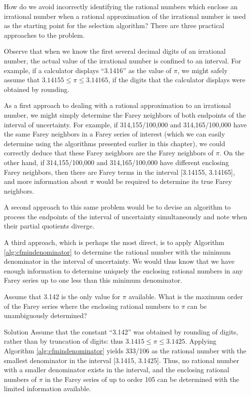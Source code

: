 How do we avoid incorrectly identifying the rational
numbers which enclose an irrational number when a
rational approximation of the irrational number is
used as the starting point for the selection algorithm?
There are three practical approaches to the problem.

Observe that when we know
the first several decimal digits of an irrational number,
the actual value of the irrational number is confined
to an interval.  For example, if a calculator displays
``3.1416'' as the value of $\pi$, we might safely
assume that $3.14155 \leq \pi \leq 3.14165$, if the
digits that the calculator displays were 
obtained by rounding.  

As a first approach to dealing with a rational approximation
to an irrational number,
we might simply determine the
Farey neighbors of both endpoints of the interval of
uncertainty.  For example, if
314,155/100,000 and 314,165/100,000 have the same 
Farey neighbors in a Farey series of interest (which we can
easily determine using the algorithms presented earlier
in this chapter), we could
correctly deduce that these Farey neighbors are the
Farey neighbors of $\pi$.  On the other hand,
if 314,155/100,000 and 314,165/100,000 have different
enclosing Farey neighbors, then there are Farey 
terms in the interval [3.14155, 3.14165],
and more information about $\pi$
would be required to determine its true Farey neighbors.

A second approach to this same problem would be to devise an
algorithm to process
the endpoints of the interval of uncertainty simultaneously and note
when their partial quotients diverge.  

A third approach, which is 
perhaps the most direct, is to apply 
Algorithm \ref{alg:cfmindenominator} to determine
the rational number with the minimum denominator in the interval of uncertainty.
We would thus know that we have enough information to determine uniquely the
enclosing rational numbers in any Farey series up to one less than this 
minimum denominator.

\begin{vworkexamplestatement}
\label{ex:ccfr0:sptq0:02}
Assume that 3.142 is the only value for $\pi$ available.  What is the maximum
order of the Farey series where the enclosing rational numbers to $\pi$ can
be unambiguously determined?
\end{vworkexamplestatement}
\begin{vworkexampleparsection}{Solution}
Assume that the constant ``3.142'' was obtained by rounding of digits, rather than
by truncation of digits:  thus $3.1415 \leq \pi \leq 3.1425$.  Applying
Algorithm \ref{alg:cfmindenominator} yields 333/106
as the rational number with the smallest denominator in the interval
[3.1415, 3.1425].  Thus, no rational number with a smaller denominator exists
in the interval, and the enclosing rational numbers of $\pi$ in the Farey series of
up to order 105 can be determined with the limited information available.
\end{vworkexampleparsection}
\vworkexamplefooter{}


